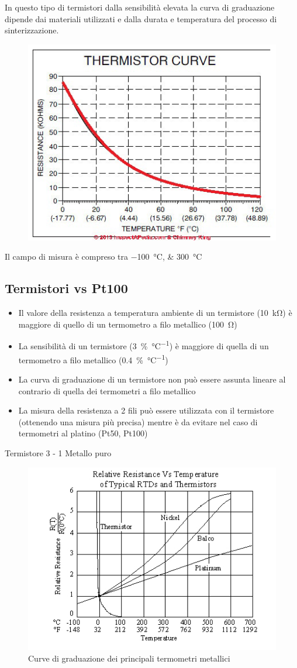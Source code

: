 \documentclass[a4paper, 15pt]{article}
\begin{document}
\begin{adjustwidth}{2in}{}
\begin{itemize}
		In questo tipo di termistori dalla sensibilità elevata la curva di graduazione dipende dai materiali utilizzati e dalla durata e temperatura del processo di sinterizzazione.
		\begin{figure}[H]
			\centering
			\includegraphics[width=0.3\linewidth]{immagini/screenshot017}
			\label{fig:screenshot017}
		\end{figure}
		Il campo di misura è compreso tra \SIlist{-100;+300}{\celsius}		
	\end{itemize}
\end{adjustwidth}
\newpage
\subsection{Termistori vs Pt100}
\begin{adjustwidth}{2in}{} 	
	\begin{itemize}
		\item Il valore della resistenza a temperatura ambiente di un termistore (\SI{10}{\kilo\ohm}) è maggiore di
		quello di un termometro a filo metallico (\SI{100}{\ohm}) 
		\item La sensibilità di un termistore (\SI{3}{\percent\per\celsius}) è maggiore
		di quella di un termometro a filo metallico (\SI{0.4}{\percent\per\celsius})
		\item La curva di graduazione di un termistore non può essere assunta lineare al
		contrario di quella dei termometri a filo metallico
		\item La misura della resistenza a 2 fili può essere utilizzata con il termistore (ottenendo una misura più precisa) mentre è da evitare nel caso di termometri al platino (Pt50, Pt100)
	\end{itemize}	
	\begin{center}
		Termistore 3 - 1 Metallo puro
	\end{center} 
	\begin{figure}[H]
		\centering
		\includegraphics[width=0.7\linewidth]{immagini/screenshot018}
		\caption{Curve di graduazione dei principali termometri metallici}
		\label{fig:screenshot018}
	\end{figure}
\end{adjustwidth}
\newpage
\end{document}
